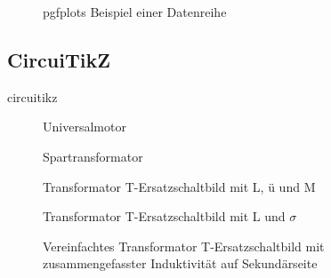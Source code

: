 \begin{figure}[!htbp]
    \centering
    \begin{minipage}[t]{0.95\textwidth}
        \centering
        \caption{\Gls{pgfplots} Beispiel einer Datenreihe}
        \label{fig:pgfplotsexampledata}
    \end{minipage}
\end{figure}

\clearpage

\subsection{CircuiTikZ}\label{subsec:circuitikz}

\Gls{circuitikz}

\begin{figure}[!htbp]
    
    \caption{Universalmotor}
    \label{fig:universalmotor}
\end{figure}

\begin{figure}[!htbp]
    
    \caption{Spartransformator}
    \label{fig:autotransformer}
\end{figure}

\begin{figure}[!htbp]
    
    \caption{Transformator T-Ersatzschaltbild mit L, ü und M}
    \label{fig:transformertequivalent}
\end{figure}

\begin{figure}[!htbp]
    
    \caption{Transformator T-Ersatzschaltbild mit L und $\sigma$}
    \label{fig:transformertequivalent2}
\end{figure}

\begin{figure}[!htbp]
    
    \caption{Vereinfachtes Transformator T-Ersatzschaltbild mit zusammengefasster Induktivität auf Sekundärseite}
    \label{fig:transformertequivalent3}
\end{figure}

